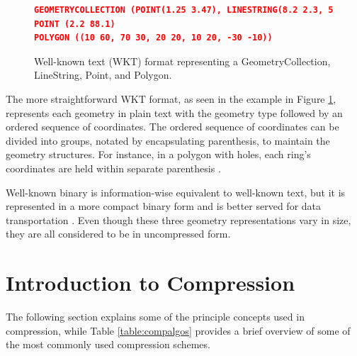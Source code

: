 \begin{figure}[htbp]
\begin{lstlisting}[language=json,firstnumber=1, basicstyle=\footnotesize\ttfamily]
GEOMETRYCOLLECTION (POINT(1.25 3.47), LINESTRING(8.2 2.3, 5.5 1.8))
POINT (2.2 88.1)
POLYGON ((10 60, 70 30, 20 20, 10 20, -30 -10))
\end{lstlisting}    
\caption{Well-known text (WKT) format representing a GeometryCollection, LineString, Point, and Polygon.}
    \label{fig:wkt}
\end{figure}

The more straightforward WKT format, as seen in the example in Figure \ref{fig:wkt}, represents each geometry in plain text with the geometry type followed by an ordered sequence of coordinates. The ordered sequence of coordinates can be divided into groups, notated by encapsulating parenthesis, to maintain the geometry structures. For instance, in a polygon with holes, each ring's coordinates are held within separate parenthesis \cite{WKT}.

Well-known binary is information-wise equivalent to well-known text, but it is represented in a more compact binary form and is better served for data transportation \cite{WKB}. Even though these three geometry representations vary in size, they are all considered to be in uncompressed form.






\section{Introduction to Compression}
The following section explains some of the principle concepts used in compression, while Table \ref{table:compalgos} provides a brief overview of some of the most commonly used compression schemes. 





